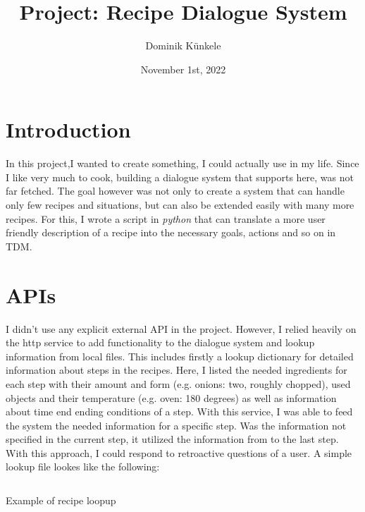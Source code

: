 \documentclass[
	11pt, %
]{fphw}
\title{Project: Recipe Dialogue System} %
\date{November 1st, 2022} %
\author{Dominik Künkele}
\institute{University of Gothenburg} %
\newenvironment{code}
    {\captionsetup{
        type=listing,
        skip=2pt,
        belowskip=15pt
        }}
    {}
\begin{document}
\maketitle %

\listoftodos

\section*{Introduction}
In this project,I wanted to create something, I could actually use in my life. Since I like very much to cook, building a dialogue system that supports here, was not far fetched. The goal however was not only to create a system that can handle only few recipes and situations, but can also be extended easily with many more recipes. For this, I wrote a script in \emph{python} that can translate a more user friendly description of a recipe into the necessary goals, actions and so on in TDM.

\section*{APIs}\label{section:api}
I didn't use any explicit external API in the project. However, I relied heavily on the http service to add functionality to the dialogue system and lookup information from local files. This includes firstly a lookup dictionary for detailed information about steps in the recipes. Here, I listed the needed ingredients for each step with their amount and form (e.g. onions: two, roughly chopped), used objects and their temperature (e.g. oven: 180 degrees) as well as information about time end ending conditions of a step. With this service, I was able to feed the system the needed information for a specific step. Was the information not specified in the current step, it utilized the information from to the last step. With this approach, I could respond to retroactive questions of a user. A simple lookup file lookes like the following:

\begin{code}
    \inputminted{json}{includes/recipe_lookup.json}
    \caption{Example of recipe loopup}
\end{code}
\end{document}
